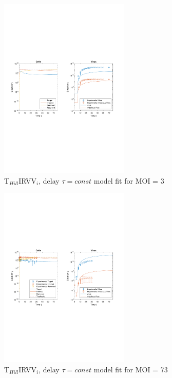 \begin{figure}[H]
\begin{center}
\includegraphics[width=0.55\textwidth, trim={1cm 9.5cm 1cm 9.5cm}, clip]{D_chapters/6_appendix/4_THillIRVViDelayFitTau/ModelTHillIRVViDelayFitTauDSNFittedMOI3B0.000659D0.55529P5629.8721C0.066804TIC2576955.7218TH4.025T0.2iFrac0.025402log.pdf}
\caption[T$_{Hill}$IRVV$_i$, delay $\tau = const$ model fit for MOI = 3]%
{T$_{Hill}$IRVV$_i$, delay $\tau = const$ model fit for MOI = 3}
\label{figure:THillIRVViDelayFitTauMOI3}
\end{center}
\end{figure}

\begin{figure}[H]
\begin{center}
\includegraphics[width=0.55\textwidth, trim={1cm 9.5cm 1cm 9.5cm}, clip]{D_chapters/6_appendix/4_THillIRVViDelayFitTau/ModelTHillIRVViDelayFitTauDSNFittedMOI73B0.000659D0.55529P5629.8721C0.066804TIC2576955.7218TH4.025T0.2iFrac0.025402log.pdf}
\caption[T$_{Hill}$IRVV$_i$, delay $\tau = const$ model fit for MOI = 73]%
{T$_{Hill}$IRVV$_i$, delay $\tau = const$ model fit for MOI = 73}
\label{figure:THillIRVViDelayFitTauMOI73}
\end{center}
\end{figure}